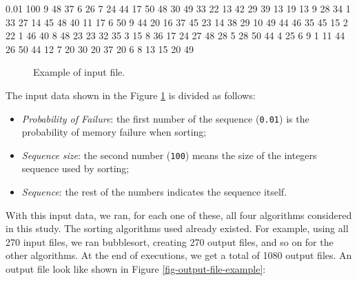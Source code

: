 
\begin{verbbox}[\mbox{}]
0.01 100 9 48 37 6 26 7 24 44 17 50 48 30 49 33 22 13 42 29 39 13 19 13 9 28 
34 1 33 27 14 45 48 40 11 17 6 50 9 44 20 16 37 45 23 14 38 29 10 49 44 46 35
45 15 2 22 1 46 40 8 48 23 23 32 35 3 15 8 36 17 24 27 48 28 5 28 50 44 4 25 
6 9 1 11 44 26 50 44 12 7 20 30 20 37 20 6 8 13 15 20 49
\end{verbbox}

\begin{figure}[H]
    \centering
    \fbox{
    \theverbbox
    }
    \caption{Example of input file.}
    \label{fig-input-file-example}
\end{figure}

The input data shown in the Figure \ref{fig-input-file-example} is divided as follows:

\begin{itemize}
    \item \textit{Probability of Failure}: the first number of the sequence (\texttt{0.01}) is the probability of memory failure when sorting;
    \item \textit{Sequence size}: the second number (\texttt{100}) means the size of the integers sequence used by sorting;
    \item \textit{Sequence}: the rest of the numbers indicates the sequence itself.
\end{itemize}

With this input data, we ran, for each one of these, all four algorithms considered in this study. The sorting algorithms used already existed. For example, using all 270 input files, we ran bubblesort, creating 270 output files, and so on for the other algorithms. At the end of executions, we get a total of 1080 output files. An output file look like shown in Figure \ref{fig-output-file-example}:


